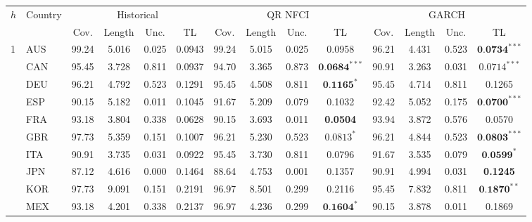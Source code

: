 





\begin{tabular}{llcccccccccccc}
  \toprule
\multicolumn{1}{c}{\multirow{2}{*}{$h$}} & \multicolumn{1}{c}{\multirow{2}{*}{Country}} &
  \multicolumn{4}{c}{{Historical}} &   \multicolumn{4}{c}{{QR NFCI}} & 
  \multicolumn{4}{c}{{GARCH}} \\  & &     Cov. & Length & Unc. & TL &
                               Cov. & Length & Unc. & TL &
                               Cov. & Length & Unc. & TL \\ 
 \cmidrule{1-1}  \cmidrule(lr){2-2} \cmidrule(lr){3-6} \cmidrule(lr){7-10} \cmidrule(lr){11-14}
\multirow{12}{*}{{1}}
                        &  AUS  &  99.24  &  5.016  &  0.025  &  0.0943  &  99.24  &  5.015  &  0.025  &  0.0958  &  96.21  &  4.431  &  0.523  & $\textbf{0.0734}^{***}$ \\
 &     CAN  &  95.45  &  3.728  &  0.811  &  0.0937  &  94.70  &  3.365  &  0.873  & $ \textbf{0.0684} ^{***}$ &  90.91  &  3.263  &  0.031  & $0.0714^{***}$ \\
 &     DEU  &  96.21  &  4.792  &  0.523  &  0.1291  &  95.45  &  4.508  &  0.811  & $ \textbf{0.1165} ^{*}$ &  95.45  &  4.714  &  0.811  &  0.1265 \\ 
 &     ESP  &  90.15  &  5.182  &  0.011  &  0.1045  &  91.67  &  5.209  &  0.079  &  0.1032  &  92.42  &  5.052  &  0.175  & $\textbf{0.0700}^{***}$ \\
 &     FRA  &  93.18  &  3.804  &  0.338  &  0.0628  &  90.15  &  3.693  &  0.011  &  \textbf{0.0504}  &  93.94  &  3.872  &  0.576  &  0.0570 \\ 
 &     GBR  &  97.73  &  5.359  &  0.151  &  0.1007  &  96.21  &  5.230  &  0.523  & $ 0.0813 ^{*}$ &  96.21  &  4.844  &  0.523  & $\textbf{0.0803}^{***}$ \\
 &     ITA  &  90.91  &  3.735  &  0.031  &  0.0922  &  95.45  &  3.730  &  0.811  &  0.0796  &  91.67  &  3.535  &  0.079  & $\textbf{0.0599}^{*}$ \\
 &     JPN  &  87.12  &  4.616  &  0.000  &  0.1464  &  88.64  &  4.753  &  0.001  &  0.1357  &  90.91  &  4.994  &  0.031  &  \textbf{0.1245} \\ 
 &     KOR  &  97.73  &  9.091  &  0.151  &  0.2191  &  96.97  &  8.501  &  0.299  &  0.2116  &  95.45  &  7.832  &  0.811  & $\textbf{0.1870}^{**}$ \\
 &     MEX  &  93.18  &  4.201  &  0.338  &  0.2137  &  96.97  &  4.236  &  0.299  & $ \textbf{0.1604} ^{*}$ &  90.15  &  3.878  &  0.011  &  0.1869 \\ 

\end{tabular}
